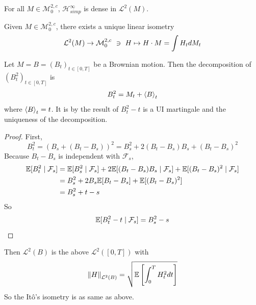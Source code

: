 \documentclass[a4paper,12pt]{article}
\begin{document}
\begin{itemize}
  \begin{thm}
    For all $M \in \mathcal{M}_0^{2,c}$, $\mathcal{H}_{simp}^{\infty}$ is dense in $\mathcal{L}^2(M)$.
  \end{thm}

  \begin{thm}
    Given $M \in \mathcal{M}_0^{2,c}$, there exists a unique linear isometry
    \begin{equation*}
      \mathcal{L}^2(M) \rightarrow \mathcal{M}_0^{2,c}~\ni~H \mapsto H \cdot M = \int H_t dM_t
    \end{equation*}
  \end{thm}

  \begin{exam}
    Let $M = B = (B_t)_{t \in [0,T]}$ be a Brownian motion. Then the decomposition of $(B_t^2)_{t \in [0,T]}$ is
    \begin{equation*}
      B_t^2 = M_t + \left\langle B \right\rangle_t
    \end{equation*}
    where $\left\langle B \right\rangle_t = t$. It is by the result of $B_t^2 - t$ is a UI martingale and the uniqueness of the decomposition.
    \begin{proof}
      First,
      \begin{equation*}
        B_t^2 = (B_s + (B_t-B_s))^2 = B_s^2 + 2(B_t-B_s)B_s + (B_t-B_s)^2
      \end{equation*}
      Because $B_t-B_s$ is independent with $\mathcal{F}_s$,
      \begin{equation*}
        \begin{split}
          \mathbb{E}[B_t^2 \mid \mathcal{F}_s] &= \mathbb{E}[B_s^2 \mid \mathcal{F}_s] + 2\mathbb{E}[(B_t-B_s)B_s \mid \mathcal{F}_s] + \mathbb{E}[(B_t-B_s)^2 \mid \mathcal{F}_s] \\
          &= B_s^2 +2B_s\mathbb{E}[B_t-B_s] + \mathbb{E}[(B_t-B_s)^2] \\
          &= B_s^2 + t-s
        \end{split}
      \end{equation*}
      So
      \begin{equation*}
        \mathbb{E}[B_t^2 - t \mid \mathcal{F}_s] = B_s^2 - s
      \end{equation*}
    \end{proof}
    Then $\mathcal{L}^2(B)$ is the above $\mathcal{L}^2([0,T])$ with
    \begin{equation*}
      \left\lVert H\right\lVert_{\mathcal{L}^2(B)} = \sqrt{\mathbb{E}\left[\int_0^TH_t^2 dt\right]}
    \end{equation*}
    So the It\^o's isometry is as same as above.
  \end{exam}
\end{itemize}
\end{document}
